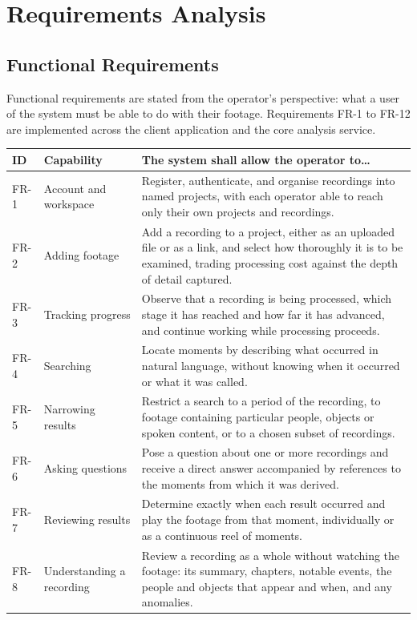 \section{Requirements Analysis}

\subsection{Functional Requirements}

Functional requirements are stated from the operator's perspective: what a user of the
system must be able to do with their footage. Requirements FR-1 to FR-12 are
implemented across the client application and the core analysis service.

\begin{table}[htbp]
\centering
\small
\begin{tabularx}{\textwidth}{@{}lL{2.8cm}X@{}}
\toprule
\textbf{ID} & \textbf{Capability} & \textbf{The system shall allow the operator to\dots} \\
\midrule
FR-1 & Account and workspace & Register, authenticate, and organise recordings into named projects, with each operator able to reach only their own projects and recordings. \\
FR-2 & Adding footage & Add a recording to a project, either as an uploaded file or as a link, and select how thoroughly it is to be examined, trading processing cost against the depth of detail captured. \\
FR-3 & Tracking progress & Observe that a recording is being processed, which stage it has reached and how far it has advanced, and continue working while processing proceeds. \\
FR-4 & Searching & Locate moments by describing what occurred in natural language, without knowing when it occurred or what it was called. \\
FR-5 & Narrowing results & Restrict a search to a period of the recording, to footage containing particular people, objects or spoken content, or to a chosen subset of recordings. \\
FR-6 & Asking questions & Pose a question about one or more recordings and receive a direct answer accompanied by references to the moments from which it was derived. \\
FR-7 & Reviewing results & Determine exactly when each result occurred and play the footage from that moment, individually or as a continuous reel of moments. \\
FR-8 & Understanding a recording & Review a recording as a whole without watching the footage: its summary, chapters, notable events, the people and objects that appear and when, and any anomalies. \\

\end{tabularx}
\end{table}
